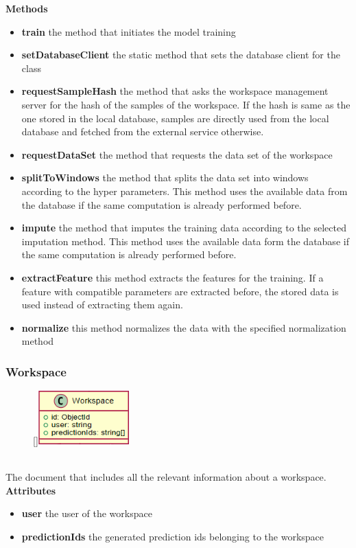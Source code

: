 \textbf{Methods}
\begin{itemize}
    \item \textbf{train} the method that initiates the model training
    \item \textbf{setDatabaseClient} the static method that sets the database client for the class
    \item \textbf{requestSampleHash} the method that asks the workspace management server for the hash of the samples of the workspace. If the hash is same as the one stored in the local database, samples are directly used from the local database and fetched from the external service otherwise.
    \item \textbf{requestDataSet} the method that requests the data set of the workspace
    \item \textbf{splitToWindows} the method that splits the data set into windows according to the hyper parameters. This method uses the available data from the database if the same computation is already performed before.
    \item \textbf{impute} the method that imputes the training data according to the selected imputation method. This method uses the available data form the database if the same computation is already performed before.
    \item \textbf{extractFeature} this method extracts the features for the training. If a feature with compatible parameters are extracted before, the stored data is used instead of extracting them again.
    \item \textbf{normalize} this method normalizes the data with the specified normalization method
\end{itemize}

\subsubsection{Workspace}
\label{mm-Workspace}
\begin{figure}
    \raisebox{0pt}[\dimexpr{}\baselineskip\relax]{\includegraphics[width=3.5cm]{classes/model-management/2.png}}
\end{figure} 
~\\
The document that includes all the relevant information about a workspace.
\newline
\newline
\newline
\newline
\textbf{Attributes}
\begin{itemize}
    \item \textbf{user} the user of the workspace
    \item \textbf{predictionIds} the generated prediction ids belonging to the workspace
\end{itemize}

